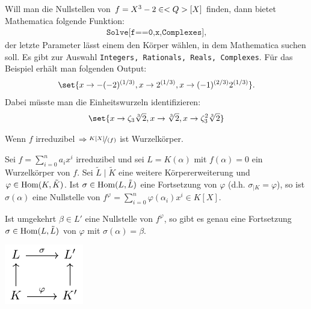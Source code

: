 \begin{mathematica}
	Will man die Nullstellen von $f = X^3 - 2 \in <Q>[X]$ finden, dann bietet Mathematica folgende Funktion:
	\begin{align*}
		\texttt{Solve[f==0,x,Complexes]},
	\end{align*}
	der letzte Parameter lässt einem den Körper wählen, in dem Mathematica suchen soll. Es gibt zur Auswahl \texttt{Integers, Rationals, Reals, Complexes}. Für das Beispiel erhält man folgenden Output:
	\begin{align*}
		\set{x \to -(-2)^{(1/3)}, x \to 2^{(1/3)}, x \to (-1)^{(2/3)} 2^{(1/3)}}.
	\end{align*}
	Dabei müsste man die Einheitswurzeln identifizieren:
	\begin{align*}
		\set{x \to \zeta_3\sqrt[3]{2}, x \to \sqrt[3]{2}, x \to \zeta_3^2 \sqrt[3]{2}}
	\end{align*}
\end{mathematica}
\begin{*anmerkung}
	Wenn $f$ irreduzibel $\Rightarrow \lnkset{K[X]}{(f)}$ ist Wurzelkörper.
\end{*anmerkung}
\begin{lemma}
	Sei $f = \sum_{i=0}^n a_i x^i$ irreduzibel und sei $L = K(\alpha)$ mit $f(\alpha)=0$ ein Wurzelkörper von $f$. Sei $\tilde{L}\mid \tilde{K}$ eine weitere Körpererweiterung und $\varphi \in \operatorname{Hom}(K,\tilde{K})$. Ist $\sigma \in \operatorname{Hom}(L,\tilde{L})$ eine Fortsetzung von $\varphi$ (d.h. $\sigma_{\mid K} = \varphi$), so ist $\sigma(\alpha)$ eine Nullstelle von $f^{\varphi}=\sum_{i=0}^n \varphi(\alpha_i)x^i \in K[X]$.
	
	Ist umgekehrt $\beta \in L' $ eine Nullstelle von $f^{\varphi}$, so gibt es genau eine Fortsetzung $\sigma \in \operatorname{Hom}(L,\tilde{L})$ von $\varphi$ mit $\sigma(\alpha) = \beta$.
\begin{center} %
	\includegraphics{./tikz/lemma_1_3_12.pdf}
\end{center}
\end{lemma}
